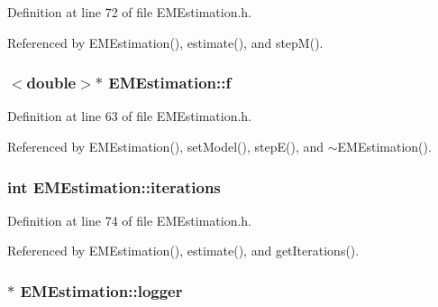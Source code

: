 Definition at line 72 of file E\+M\+Estimation.\+h.



Referenced by E\+M\+Estimation(), estimate(), and step\+M().

\hypertarget{classEMEstimation_a4ad566123ad607b791d56990f9dd096d}{}
\subsubsection[{f}]{$<$double$>$$\ast$ E\+M\+Estimation\+::f\hspace{0.3cm}{\ttfamily [private]}}\label{classEMEstimation_a4ad566123ad607b791d56990f9dd096d}


Definition at line 63 of file E\+M\+Estimation.\+h.



Referenced by E\+M\+Estimation(), set\+Model(), step\+E(), and $\sim$\+E\+M\+Estimation().

\hypertarget{classEMEstimation_ad6086e6784a5c651e6d5ad45a0c84d11}{}
\subsubsection[{iterations}]{\setlength{\rightskip}{0pt plus 5cm}int E\+M\+Estimation\+::iterations\hspace{0.3cm}{\ttfamily [private]}}\label{classEMEstimation_ad6086e6784a5c651e6d5ad45a0c84d11}


Definition at line 74 of file E\+M\+Estimation.\+h.



Referenced by E\+M\+Estimation(), estimate(), and get\+Iterations().

\hypertarget{classEMEstimation_a77ab33231a9baa8c5a2ceb48534137a0}{}
\subsubsection[{logger}]{$\ast$ E\+M\+Estimation\+::logger\hspace{0.3cm}{\ttfamily [private]}}\label{classEMEstimation_a77ab33231a9baa8c5a2ceb48534137a0}


